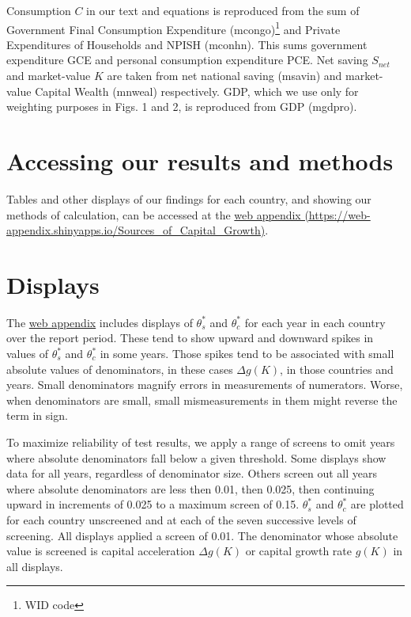 \documentclass[a4paper,fleqn]{latex_styles/cas-sc}
\begin{document}
Consumption $C$ in our text and equations is reproduced from the sum of Government Final Consumption Expenditure (mcongo)\footnote{\label{widnote}WID code} and Private Expenditures of Households and NPISH (mconhn). This sums government expenditure GCE and personal consumption expenditure PCE. Net saving $S_{net}$ and market-value $K$ are taken from net national saving (msavin) and market-value Capital Wealth (mnweal) respectively. GDP, which we use only for weighting purposes in Figs. 1 and 2, is reproduced from GDP (mgdpro).

\hypertarget{accessing-our-results-and-methods}{%
\section{Accessing our results and
methods}\label{accessing-our-results-and-methods}}

Tables and other displays of our findings for each country, and showing
our methods of calculation, can be accessed at the
\href{https://web-appendix.shinyapps.io/Sources\_of\_Capital\_Growth/}{web appendix (https://web-appendix.shinyapps.io/Sources\_of\_Capital\_Growth)}.

\hypertarget{sec-displays}{%
\section{Displays}\label{sec-displays}}

The \href{https://web-appendix.shinyapps.io/Sources\_of\_Capital\_Growth/}{web
appendix} includes displays of \(\theta_s^*\) and \(\theta_c^*\) for
each year in each country over the report period. These tend to show
upward and downward spikes in values of \(\theta_s^*\) and \(\theta_c^*\)
in some years. Those spikes tend to be associated with small absolute
values of denominators, in these cases \(\Delta g(K)\), in those
countries and years. Small denominators magnify errors in measurements
of numerators. Worse, when denominators are small, small mismeasurements in them might reverse the term in sign.

To maximize reliability of test results, we apply a range of screens to
omit years where absolute denominators fall below a given
threshold. Some displays show data for all years, regardless of denominator size.
Others screen out all years where
absolute denominators are less then 0.01, then 0.025, then continuing upward in
increments of 0.025 to a maximum screen of 0.15. \(\theta_s^*\) and \(\theta_c^*\)
are plotted for each country unscreened and at each of the
seven successive levels of screening. All displays applied a screen of 0.01. 
The denominator whose absolute value is screened is capital acceleration
$\Delta g(K)$ or capital growth rate \(g(K)\) in all displays. 
\end{document}
